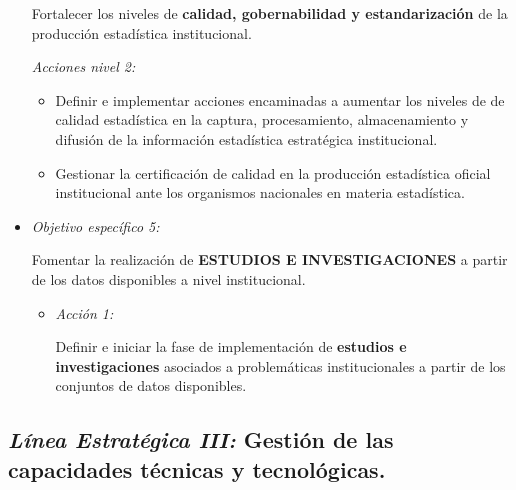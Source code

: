 \documentclass[
]{book}
\providecommand{\tightlist}{%
  \setlength{\itemsep}{0pt}\setlength{\parskip}{0pt}}
\begin{document}
\begin{itemize}
  Fortalecer los niveles de \textbf{calidad, gobernabilidad y estandarización} de la producción estadística institucional.

  \emph{Acciones nivel 2:}

  \begin{itemize}
  \tightlist
  \item
    Definir e implementar acciones encaminadas a aumentar los niveles de de calidad estadística en la captura, procesamiento, almacenamiento y difusión de la información estadística estratégica institucional.
  \item
    Gestionar la certificación de calidad en la producción estadística oficial institucional ante los organismos nacionales en materia estadística.
  \end{itemize}
\item
  \emph{Objetivo específico 5:}

  Fomentar la realización de \textbf{ESTUDIOS E INVESTIGACIONES} a partir de los datos disponibles a nivel institucional.

  \begin{itemize}
  \item
    \emph{Acción 1:}

    Definir e iniciar la fase de implementación de \textbf{estudios e investigaciones} asociados a problemáticas institucionales a partir de los conjuntos de datos disponibles.
  \end{itemize}
\end{itemize}

\hypertarget{luxednea-estratuxe9gica-iii-gestiuxf3n-de-las-capacidades-tuxe9cnicas-y-tecnoluxf3gicas.}{%
\subsection{\texorpdfstring{\emph{Línea Estratégica III:} Gestión de las capacidades técnicas y tecnológicas.}{Línea Estratégica III: Gestión de las capacidades técnicas y tecnológicas.}}\label{luxednea-estratuxe9gica-iii-gestiuxf3n-de-las-capacidades-tuxe9cnicas-y-tecnoluxf3gicas.}}
\end{document}
